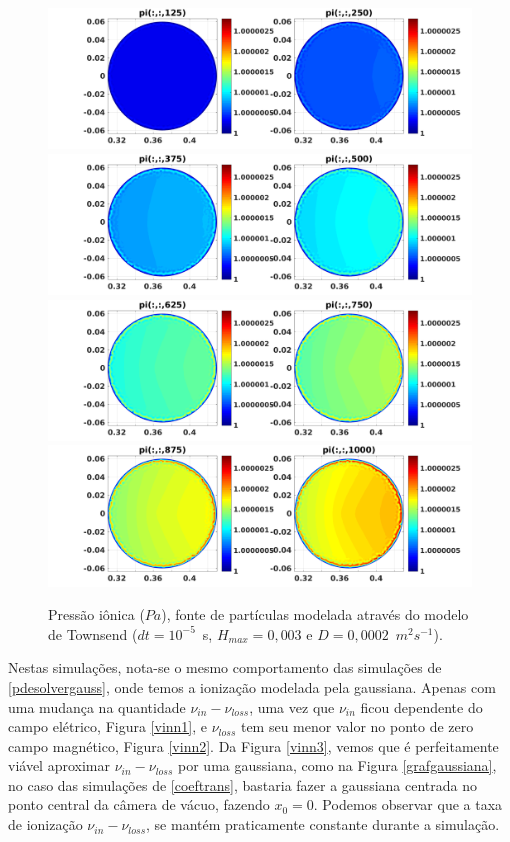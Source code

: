 \documentclass[12pt,oneside,a4paper]{abntex2}
\begin{document}
\begin{figure}[H]
\centering
\includegraphics[scale=0.5]{../SImulacao_breakdown/PDE/pitod1B2.png}  
\includegraphics[scale=0.5]{../SImulacao_breakdown/PDE/pitod2B2.png} 
\includegraphics[scale=0.5]{../SImulacao_breakdown/PDE/pitod3B2.png} 
\includegraphics[scale=0.5]{../SImulacao_breakdown/PDE/pitod4B2.png} 
\caption{Pressão iônica ($Pa$), fonte de partículas modelada através do modelo de Townsend ($dt=10^{-5}$\ s, $H_{max} = 0,003$ e $D=0,0002$\ $m^2s^{-1}$).}
\label{resucoef4}
\end{figure}
\noindent Nestas simulações, nota-se o mesmo comportamento das simulações de \ref{pdesolvergauss}, onde temos a ionização modelada pela gaussiana. 
Apenas com uma mudança na quantidade $\nu_{in}-\nu_{loss}$, uma vez que $\nu_{in}$ ficou dependente do campo elétrico, Figura \ref{vinn1}, e $ \nu_{loss}$ tem seu menor valor no ponto de zero campo magnético, Figura \ref{vinn2}. 
Da Figura \ref{vinn3}, vemos que é perfeitamente viável aproximar $\nu_{in}-\nu_{loss}$ por uma gaussiana, como na Figura \ref{grafgaussiana}, no caso das simulações de \ref{coeftrans}, bastaria fazer a gaussiana centrada no ponto central da câmera de vácuo, fazendo $x_0=0$. Podemos observar que a taxa de ionização $\nu_{in}-\nu_{loss}$, se mantém praticamente constante durante a simulação.   
\end{document}
